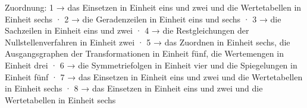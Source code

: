 
Zuordnung: 1 → das Einsetzen in Einheit eins und zwei und die Wertetabellen in Einheit sechs · 2 → die Geradenzeilen in Einheit eins und sechs · 3 → die Sachzeilen in Einheit eins und zwei · 4 → die Restgleichungen der Nullstellenverfahren in Einheit zwei · 5 → das Zuordnen in Einheit sechs, die Ausgangsgraphen der Transformationen in Einheit fünf, die Wertemengen in Einheit drei · 6 → die Symmetriefolgen in Einheit vier und die Spiegelungen in Einheit fünf · 7 → das Einsetzen in Einheit eins und zwei und die Wertetabellen in Einheit sechs · 8 → das Einsetzen in Einheit eins und zwei und die Wertetabellen in Einheit sechs

